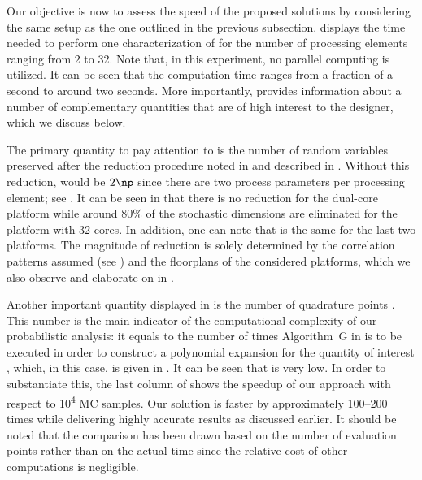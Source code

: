 
Our objective is now to assess the speed of the proposed solutions by
considering the same setup as the one outlined in the previous subsection.
 displays the time needed to perform one
characterization of \vg for the number of processing elements \np ranging from 2
to 32. Note that, in this experiment, no parallel computing is utilized. It can
be seen that the computation time ranges from a fraction of a second to around
two seconds. More importantly,  provides
information about a number of complementary quantities that are of high interest
to the designer, which we discuss below.

The primary quantity to pay attention to is the number of random variables \nz
preserved after the reduction procedure noted in
 and described in
. Without this reduction, \nz would be $2 \np$
since there are two process parameters per processing element; see
. It can be seen in
 that there is no reduction for the dual-core
platform while around 80\% of the stochastic dimensions are eliminated for the
platform with 32 cores. In addition, one can note that \nz is the same for the
last two platforms. The magnitude of reduction is solely determined by the
correlation patterns assumed (see ) and the
floorplans of the considered platforms, which we also observe and elaborate on
in .

Another important quantity displayed in  is the
number of quadrature points \nq. This number is the main indicator of the
computational complexity of our probabilistic analysis: it equals to the number
of times Algorithm~G in  is to be executed in order to
construct a polynomial expansion for the quantity of interest \g, which, in this
case, is given in . It can be seen that \nq is
very low. In order to substantiate this, the last column of
 shows the speedup of our approach with respect
to 10\textsuperscript{4} \ac{MC} samples. Our solution is faster by
approximately 100--200 times while delivering highly accurate results as
discussed earlier. It should be noted that the comparison has been drawn based
on the number of evaluation points rather than on the actual time since the
relative cost of other computations is negligible.

